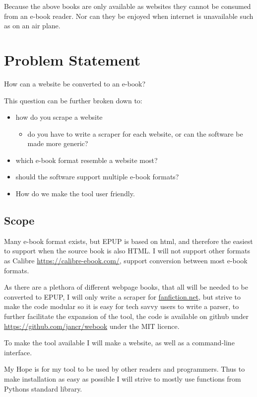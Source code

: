 \documentclass[]{report}   %
\begin{document}
Because the above books are only available as websites they cannot be consumed
from an e-book reader. Nor can they be enjoyed when internet is unavailable such
as on an air plane.

\section{Problem Statement}
How can a website be converted to an e-book?

This question can be further broken down to:
\begin{itemize}
    \item how do you scrape a website
    \begin{itemize}
        \item do you have to write a scraper for each website, or can the software be made more generic?
    \end{itemize}
    \item which e-book format resemble a website most?
    \item should the software support multiple e-book formats?
    \item How do we make the tool user friendly.
\end{itemize}

\subsection{Scope}
Many e-book format exists, but EPUP is based on html, and therefore the easiest
to support when the source book is also HTML. I will not support other formats
as Calibre \url{https://calibre-ebook.com/}, support conversion between most
e-book formats.

As there are a plethora of different webpage books, that all will be needed to
be converted to EPUP, I will only write a scraper for \url{fanfiction.net}, but
strive to make the code modular so it is easy for tech savvy users to write a
parser, to further facilitate the expansion of the tool, the code is available
on github under \url{https://github.com/jancr/webook} under the MIT licence. 

To make the tool available I will make a website, as well as a command-line
interface.

My Hope is for my tool to be used by other readers and programmers. Thus to
make installation as easy as possible I will strive to mostly use functions
from Pythons standard library.

\end{document}
